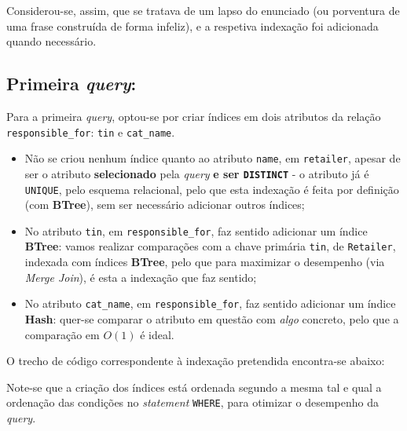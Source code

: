\documentclass[12pt,a4paper]{article}
\begin{document}
Considerou-se, assim, que se tratava de um lapso do enunciado (ou porventura de uma
frase construída de forma infeliz), e a respetiva indexação foi adicionada quando necessário.

\subsection*{Primeira \textit{query}:}



Para a primeira \textit{query}, optou-se por criar índices em dois atributos da relação \texttt{responsible\_for}:
\texttt{tin} e \texttt{cat\_name}.

\vspace*{0.25cm}

\begin{itemize}
  \item Não se criou nenhum índice quanto ao atributo \texttt{name}, em \texttt{retailer},
        apesar de ser o atributo \textbf{selecionado} pela \textit{query} \textbf{e ser
          \texttt{DISTINCT}} - o atributo já é \texttt{UNIQUE}, pelo
        esquema relacional, pelo que esta indexação é feita por definição (com
        \textbf{BTree}), sem ser necessário adicionar outros índices;

  \item No atributo \texttt{tin}, em \texttt{responsible\_for}, faz sentido adicionar um
        índice \textbf{BTree}: vamos realizar comparações com a chave primária \texttt{tin},
        de \texttt{Retailer}, indexada com índices \textbf{BTree}, pelo que para maximizar
        o desempenho (via \textit{Merge Join}), é esta a indexação que faz sentido;

  \item No atributo \texttt{cat\_name}, em \texttt{responsible\_for}, faz sentido adicionar
        um índice \textbf{Hash}: quer-se comparar o atributo em questão com \textit{algo}
        concreto, pelo que a comparação em $O(1)$ é ideal.
\end{itemize}

O trecho de código correspondente à indexação pretendida encontra-se abaixo:



Note-se que a criação dos índices está ordenada segundo a mesma tal e qual a
ordenação das condições no \textit{statement} \texttt{WHERE}, para otimizar o desempenho
da \textit{query}. %
\end{document}
